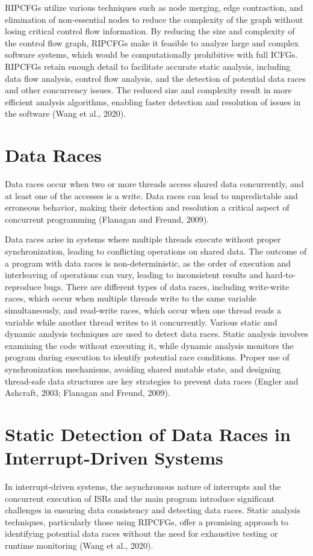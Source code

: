 \documentclass[
fancyheadings, %
%
%
]{stsreprt}
\begin{document}
{RIPCFGs utilize various techniques such as node merging, edge contraction, and elimination of non-essential nodes to reduce the complexity of the graph without losing critical control flow information. By reducing the size and complexity of the control flow graph, RIPCFGs make it feasible to analyze large and complex software systems, which would be computationally prohibitive with full ICFGs. RIPCFGs retain enough detail to facilitate accurate static analysis, including data flow analysis, control flow analysis, and the detection of potential data races and other concurrency issues. The reduced size and complexity result in more efficient analysis algorithms, enabling faster detection and resolution of issues in the software 
(Wang et al., 2020).
\section{Data Races}
Data races occur when two or more threads access shared data concurrently, and at least one of the accesses is a write. Data races can lead to unpredictable and erroneous behavior, making their detection and resolution a critical aspect of concurrent programming 
(Flanagan and Freund, 2009).
	
Data races arise in systems where multiple threads execute without proper synchronization, leading to conflicting operations on shared data. The outcome of a program with data races is non-deterministic, as the order of execution and interleaving of operations can vary, leading to inconsistent results and hard-to-reproduce bugs. There are different types of data races, including write-write races, which occur when multiple threads write to the same variable simultaneously, and read-write races, which occur when one thread reads a variable while another thread writes to it concurrently. Various static and dynamic analysis techniques are used to detect data races. Static analysis involves examining the code without executing it, while dynamic analysis monitors the program during execution to identify potential race conditions. Proper use of synchronization mechanisms, avoiding shared mutable state, and designing thread-safe data structures are key strategies to prevent data races (Engler and Ashcraft, 2003; Flanagan and Freund, 2009).
\section{Static Detection of Data Races in Interrupt-Driven Systems}
In interrupt-driven systems, the asynchronous nature of interrupts and the concurrent execution of ISRs and the main program introduce significant challenges in ensuring data consistency and detecting data races. Static analysis techniques, particularly those using RIPCFGs, offer a promising approach to identifying potential data races without the need for exhaustive testing or runtime monitoring 
(Wang et al., 2020).
	
}
\end{document}

